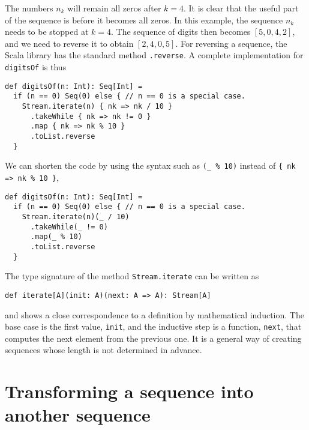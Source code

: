\noindent The numbers $n_{k}$ will remain all zeros after $k=4$.
It is clear that the useful part of the sequence is before it becomes
all zeros. In this example, the sequence $n_{k}$ needs to be stopped
at $k=4$. The sequence of digits then becomes $\left[5,0,4,2\right]$,
and we need to reverse it to obtain $\left[2,4,0,5\right]$. For reversing
a sequence, the Scala library has the standard method \lstinline!.reverse!.
A complete implementation for \lstinline!digitsOf! is thus
\begin{lstlisting}
def digitsOf(n: Int): Seq[Int] =
  if (n == 0) Seq(0) else { // n == 0 is a special case.
    Stream.iterate(n) { nk => nk / 10 }
      .takeWhile { nk => nk != 0 }
      .map { nk => nk % 10 }
      .toList.reverse
  }
\end{lstlisting}
We can shorten the code by using the syntax such as \lstinline!(_ % 10)!
instead of \lstinline!{ nk => nk % 10 }!, 
\begin{lstlisting}
def digitsOf(n: Int): Seq[Int] =
  if (n == 0) Seq(0) else { // n == 0 is a special case.
    Stream.iterate(n)(_ / 10)
      .takeWhile(_ != 0)
      .map(_ % 10)
      .toList.reverse
  }
\end{lstlisting}

The type signature of the method \lstinline!Stream.iterate! can be
written as
\begin{lstlisting}
def iterate[A](init: A)(next: A => A): Stream[A]
\end{lstlisting}
and shows a close correspondence to a definition by mathematical induction.
The base case is the first value, \lstinline!init!, and the inductive
step is a function, \lstinline!next!, that computes the next element
from the previous one. It is a general way of creating sequences whose
length is not determined in advance.

\section{Transforming a sequence into another sequence}

